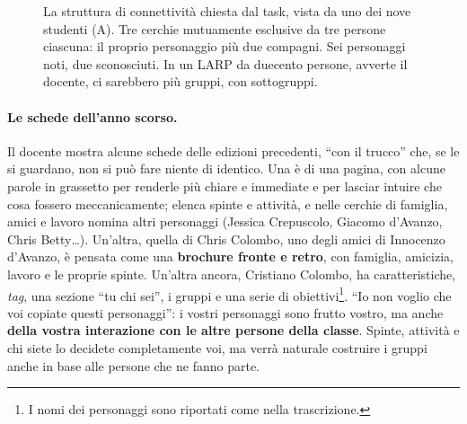 \begin{figure}[htbp]
\centering
{}
\caption{La struttura di connettività chiesta dal task, vista da uno dei nove
studenti (A). Tre cerchie mutuamente esclusive da tre persone ciascuna: il proprio
personaggio più due compagni. Sei personaggi noti, due sconosciuti. In un LARP da
duecento persone, avverte il docente, ci sarebbero più gruppi, con sottogruppi.}
\label{a4:fig:task}
\end{figure}

\paragraph{Le schede dell'anno scorso.} Il docente mostra alcune schede delle
edizioni precedenti, ``con il trucco'' che, se le si guardano, non si può fare niente
di identico. Una è di una pagina, con alcune parole in grassetto per renderle più
chiare e immediate e per lasciar intuire che cosa fossero meccanicamente; elenca
spinte e attività, e nelle cerchie di famiglia, amici e lavoro nomina altri
personaggi (Jessica Crepuscolo, Giacomo d'Avanzo, Chris Betty\ldots). Un'altra,
quella di Chris Colombo, uno degli amici di Innocenzo d'Avanzo, è pensata come una
\textbf{brochure fronte e retro}, con famiglia, amicizia, lavoro e le proprie
spinte. Un'altra ancora, Cristiano Colombo, ha caratteristiche, \emph{tag}, una
sezione ``tu chi sei'', i gruppi e una serie di obiettivi\footnote{I nomi dei
personaggi sono riportati come nella trascrizione.}. ``Io non voglio che voi
copiate questi personaggi'': i vostri personaggi sono frutto vostro, ma anche
\textbf{della vostra interazione con le altre persone della classe}. Spinte,
attività e chi siete lo decidete completamente voi, ma verrà naturale costruire i
gruppi anche in base alle persone che ne fanno parte.

